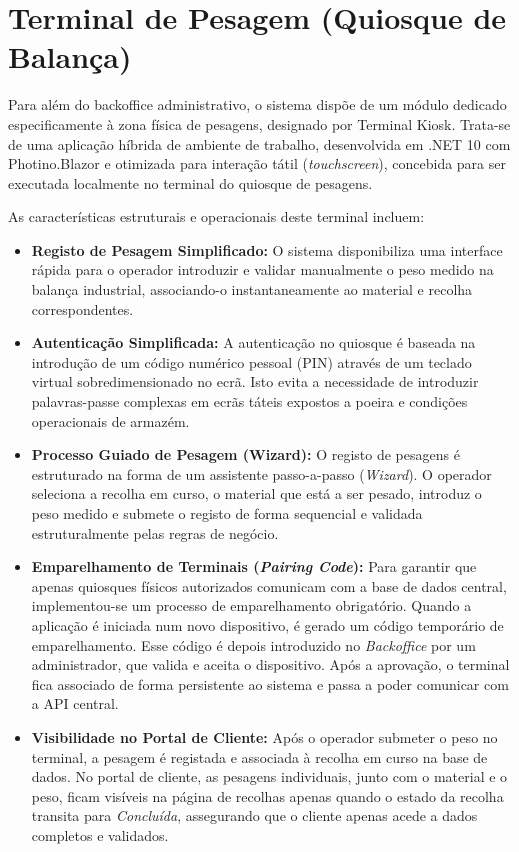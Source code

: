 \section{Terminal de Pesagem (Quiosque de Balança)}\label{sec:kiosk}

Para além do backoffice administrativo, o sistema dispõe de um módulo dedicado especificamente à zona física de pesagens, designado por Terminal Kiosk. Trata-se de uma aplicação híbrida de ambiente de trabalho, desenvolvida em .NET 10 com Photino.Blazor e otimizada para interação tátil (\textit{touchscreen}), concebida para ser executada localmente no terminal do quiosque de pesagens.

As características estruturais e operacionais deste terminal incluem:
\begin{itemize}
    \item \textbf{Registo de Pesagem Simplificado:} O sistema disponibiliza uma interface rápida para o operador introduzir e validar manualmente o peso medido na balança industrial, associando-o instantaneamente ao material e recolha correspondentes.
    \item \textbf{Autenticação Simplificada:} A autenticação no quiosque é baseada na introdução de um código numérico pessoal (PIN) através de um teclado virtual sobredimensionado no ecrã. Isto evita a necessidade de introduzir palavras-passe complexas em ecrãs táteis expostos a poeira e condições operacionais de armazém.
    \item \textbf{Processo Guiado de Pesagem (Wizard):} O registo de pesagens é estruturado na forma de um assistente passo-a-passo (\textit{Wizard}). O operador seleciona a recolha em curso, o material que está a ser pesado, introduz o peso medido e submete o registo de forma sequencial e validada estruturalmente pelas regras de negócio.
    \item \textbf{Emparelhamento de Terminais (\textit{Pairing Code}):} Para garantir que apenas quiosques físicos autorizados comunicam com a base de dados central, implementou-se um processo de emparelhamento obrigatório. Quando a aplicação é iniciada num novo dispositivo, é gerado um código temporário de emparelhamento. Esse código é depois introduzido no \textit{Backoffice} por um administrador, que valida e aceita o dispositivo. Após a aprovação, o terminal fica associado de forma persistente ao sistema e passa a poder comunicar com a \ac{API} central.
    \item \textbf{Visibilidade no Portal de Cliente:} Após o operador submeter o peso no terminal, a pesagem é registada e associada à recolha em curso na base de dados. No portal de cliente, as pesagens individuais, junto com o material e o peso, ficam visíveis na página de recolhas apenas quando o estado da recolha transita para \textit{Concluída}, assegurando que o cliente apenas acede a dados completos e validados.
\end{itemize}

